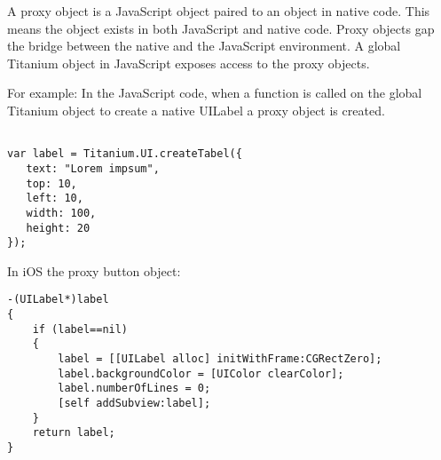 A proxy object is a JavaScript object paired to an object in native code.\cite{Whinnery2012} This means the object exists in both JavaScript and native code. Proxy objects gap the bridge between the native and the JavaScript environment. A global Titanium object in JavaScript exposes access to the proxy objects. 




For example: In the JavaScript code, when a function is called on the global Titanium object to create a native UILabel a proxy object is created.
\  %
\begin{verbatim}

var label = Titanium.UI.createTabel({
   text: "Lorem impsum",
   top: 10,
   left: 10,
   width: 100,
   height: 20
});
\end{verbatim}


In iOS the proxy button object:

\begin{verbatim}
-(UILabel*)label
{
    if (label==nil)
    {
        label = [[UILabel alloc] initWithFrame:CGRectZero];
        label.backgroundColor = [UIColor clearColor];
        label.numberOfLines = 0;
        [self addSubview:label];
    }
    return label;
}
\end{verbatim}

